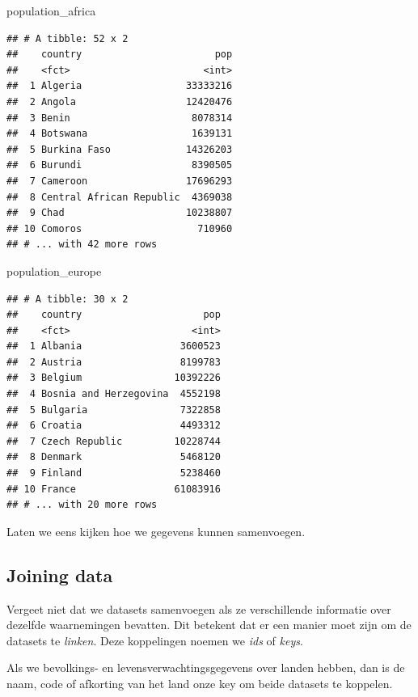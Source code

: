 \documentclass[]{tufte-book}
\newenvironment{Shaded}{}{}
\newcommand{\NormalTok}[1]{#1}
\begin{document}
\begin{Shaded}
\begin{Highlighting}[]
\NormalTok{population\_africa}
\end{Highlighting}
\end{Shaded}

\begin{verbatim}
## # A tibble: 52 x 2
##    country                       pop
##    <fct>                       <int>
##  1 Algeria                  33333216
##  2 Angola                   12420476
##  3 Benin                     8078314
##  4 Botswana                  1639131
##  5 Burkina Faso             14326203
##  6 Burundi                   8390505
##  7 Cameroon                 17696293
##  8 Central African Republic  4369038
##  9 Chad                     10238807
## 10 Comoros                    710960
## # ... with 42 more rows
\end{verbatim}

\begin{Shaded}
\begin{Highlighting}[]
\NormalTok{population\_europe}
\end{Highlighting}
\end{Shaded}

\begin{verbatim}
## # A tibble: 30 x 2
##    country                     pop
##    <fct>                     <int>
##  1 Albania                 3600523
##  2 Austria                 8199783
##  3 Belgium                10392226
##  4 Bosnia and Herzegovina  4552198
##  5 Bulgaria                7322858
##  6 Croatia                 4493312
##  7 Czech Republic         10228744
##  8 Denmark                 5468120
##  9 Finland                 5238460
## 10 France                 61083916
## # ... with 20 more rows
\end{verbatim}

Laten we eens kijken hoe we gegevens kunnen samenvoegen.

\hypertarget{joining-data}{%
\subsection{Joining data}\label{joining-data}}

Vergeet niet dat we datasets samenvoegen als ze verschillende informatie over dezelfde waarnemingen bevatten. Dit betekent dat er een manier moet zijn om de datasets te \emph{linken}. Deze koppelingen noemen we \emph{ids} of \emph{keys}.

Als we bevolkings- en levensverwachtingsgegevens over landen hebben, dan is de naam, code of afkorting van het land onze key om beide datasets te koppelen.
\end{document}
